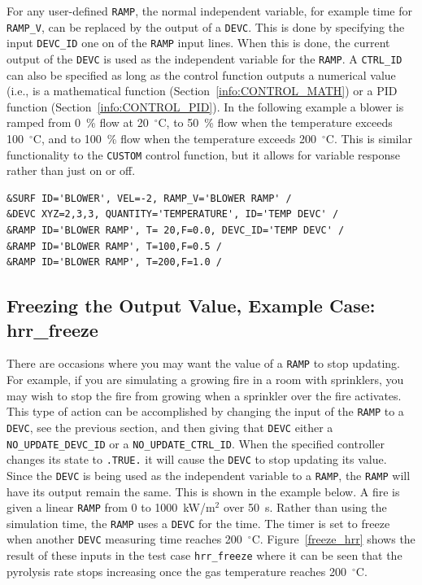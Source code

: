 \documentclass[11pt]{book}
\newcommand{\ct}{\tt\small}
\begin{document}
For any user-defined {\ct RAMP}, the normal independent variable, for example time for {\ct RAMP\_V}, can be replaced by the output of a {\ct DEVC}.
This is done by specifying the input {\ct DEVC\_ID} one on of the {\ct RAMP} input lines.  When this is done, the current output of the {\ct DEVC} is used as the independent variable for the {\ct RAMP}.  A {\ct CTRL\_ID} can also be specified as long as the control function outputs a numerical value (i.e., is a mathematical function (Section~\ref{info:CONTROL_MATH}) or a PID function (Section~\ref{info:CONTROL_PID}).
In the following example a blower is ramped from 0~\% flow at 20~$^\circ$C, to 50~\% flow when the temperature exceeds 100~$^\circ$C, and to 100~\% flow when the temperature exceeds 200~$^\circ$C.
This is similar functionality to the {\ct CUSTOM} control function, but it allows for variable response rather than just on or off.

\footnotesize
\begin{verbatim}
&SURF ID='BLOWER', VEL=-2, RAMP_V='BLOWER RAMP' /
&DEVC XYZ=2,3,3, QUANTITY='TEMPERATURE', ID='TEMP DEVC' /
&RAMP ID='BLOWER RAMP', T= 20,F=0.0, DEVC_ID='TEMP DEVC' /
&RAMP ID='BLOWER RAMP', T=100,F=0.5 /
&RAMP ID='BLOWER RAMP', T=200,F=1.0 /
\end{verbatim}
\normalsize

\subsection{Freezing the Output Value, Example Case: hrr\_freeze}
\label{info:freeze_device}

There are occasions where you may want the value of a {\ct RAMP} to stop updating.  For example, if you are simulating a growing fire in a room with sprinklers, you may wish to stop the fire from growing when a sprinkler over the fire activates.  This type of action can be accomplished by changing the input of the {\ct RAMP} to a {\ct DEVC}, see the previous section, and then giving that {\ct DEVC} either a {\ct NO\_UPDATE\_DEVC\_ID} or a {\ct NO\_UPDATE\_CTRL\_ID}.  When the specified controller changes its state to {\ct .TRUE.} it will cause the {\ct DEVC} to stop updating its value.  Since the {\ct DEVC} is being used as the independent variable to a {\ct RAMP}, the {\ct RAMP} will have its output remain the same.  This is shown in the example below.  A fire is given a linear {\ct RAMP} from 0 to 1000~kW/m$^2$ over 50~s. Rather than using the simulation time, the {\ct RAMP} uses a {\ct DEVC} for the time.  The timer is set to freeze when another {\ct DEVC} measuring time reaches 200~$^\circ$C.  Figure~\ref{freeze_hrr} shows the result of these inputs in the test case {\ct hrr\_freeze} where it can be seen that the pyrolysis rate stops increasing once the gas temperature reaches 200~$^\circ$C.
\end{document}
